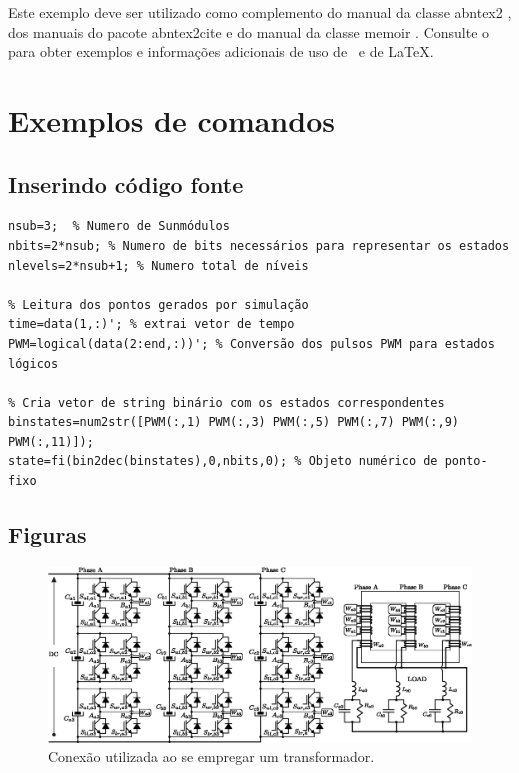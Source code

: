 \documentclass[
	article,			%
	12pt,				%
	twoside,			%
	a4paper,			%
	english,			%
	brazil,				%
	sumario=tradicional
	]{abntex2-modelo-notas-de-aula}
\begin{document}
Este exemplo deve ser utilizado como complemento do manual da classe
\textsf{abntex2} \cite{abntex2classe}, dos manuais do pacote
\textsf{abntex2cite} \cite{abntex2cite,abntex2cite-alf} e do manual da classe
\textsf{memoir} \cite{memoir}. Consulte o  para obter
exemplos e informações adicionais de uso de \abnTeX\ e de \LaTeX.

\newpage
\section{Exemplos de comandos}


\subsection{Inserindo código fonte}

\begin{lstlisting}[caption={Leitura dos dados simulados e conversão para estados topológicos.},label={lst:leituradadossim}]
% Pré definições iniciais
nsub=3;  % Numero de Sunmódulos
nbits=2*nsub; % Numero de bits necessários para representar os estados
nlevels=2*nsub+1; % Numero total de níveis

% Leitura dos pontos gerados por simulação
time=data(1,:)'; % extrai vetor de tempo
PWM=logical(data(2:end,:))'; % Conversão dos pulsos PWM para estados lógicos

% Cria vetor de string binário com os estados correspondentes
binstates=num2str([PWM(:,1) PWM(:,3) PWM(:,5) PWM(:,7) PWM(:,9) PWM(:,11)]);
state=fi(bin2dec(binstates),0,nbits,0); % Objeto numérico de ponto-fixo
\end{lstlisting}

\subsection{Figuras}



\begin{figure}[!h]
	\centering
	\includegraphics[width=1\linewidth]{figs/InversorTransformador}
	\caption{Conexão utilizada ao se empregar um transformador.}
	\label{fig:InversorTransformador}
\end{figure}
\end{document}
